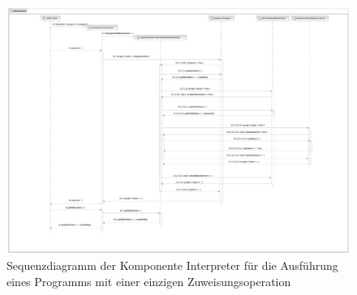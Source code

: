 \begin{landscape}%
    \begin{figure}%
        \vspace{-30mm}
        \includegraphics[width=250mm]{diagrams/interpreter_functioncall_sequence.pdf}

        \caption{Sequenzdiagramm der Komponente Interpreter für die Ausführung eines Programms mit einer einzigen Zuweisungsoperation}

    \end{figure}%
\end{landscape}%

